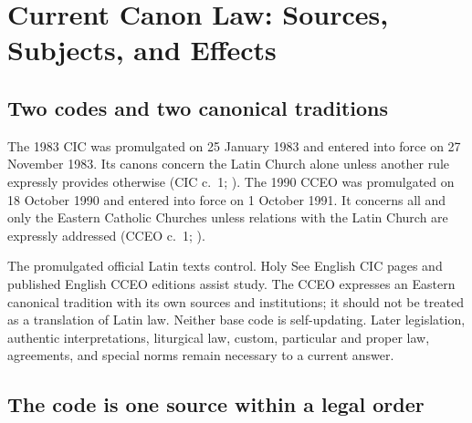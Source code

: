\section{Current Canon Law: Sources, Subjects, and Effects}

\subsection{Two codes and two canonical traditions}

The 1983 CIC was promulgated on 25 January 1983 and entered into force on 27 November 1983. Its canons concern the Latin Church alone unless another rule expressly provides otherwise (CIC c.~1; ). The 1990 CCEO was promulgated on 18 October 1990 and entered into force on 1 October 1991. It concerns all and only the Eastern Catholic Churches unless relations with the Latin Church are expressly addressed (CCEO c.~1; ).

The promulgated official Latin texts control. Holy See English CIC pages and published English CCEO editions assist study. The CCEO expresses an Eastern canonical tradition with its own sources and institutions; it should not be treated as a translation of Latin law. Neither base code is self-updating. Later legislation, authentic interpretations, liturgical law, custom, particular and proper law, agreements, and special norms remain necessary to a current answer.

\subsection{The code is one source within a legal order}

